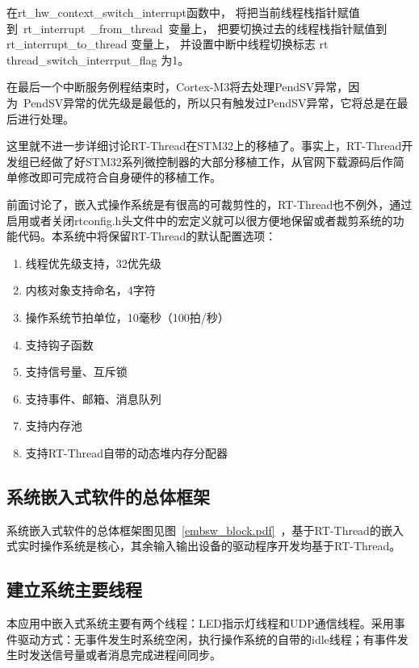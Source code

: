 在rt{\_}hw{\_}context{\_}switch{\_}interrupt函{\cf}数中{\cf}， {\cf}将把{\cf}当前{\cf}线程{\cf}栈指{\cf}针赋{\cf}值到~rt{\_}interrupt~{\_}from{\_}thread~变{\cf}量上{\cf}， {\cf}把要{\cf}切换{\cf}过去{\cf}的线{\cf}程栈{\cf}指针{\cf}赋值{\cf}到 rt{\_}interrupt{\_}to{\_}thread 变{\cf}量上{\cf}， {\cf}并设{\cf}置中{\cf}断中{\cf}线程{\cf}切换{\cf}标志{\cf} rt thread{\_}switch{\_}interrput{\_}flag 为1。

在{\cf}最后{\cf}一个{\cf}中断{\cf}服务{\cf}例程{\cf}结束{\cf}时，Cortex{\reg}-M3将{\cf}去处{\cf}理P{\cf}en{\cf}dS{\cf}V异{\cf}常，{\cf}因为~{\cf}Pe{\cf}nd{\cf}SV{\cf}异常{\cf}的优{\cf}先级{\cf}是最{\cf}低的{\cf}，所{\cf}以只{\cf}有触{\cf}发过{\cf}Pe{\cf}nd{\cf}SV{\cf}异常{\cf}，它{\cf}将总{\cf}是在{\cf}最后{\cf}进行{\cf}处理。

这里就不进一步详细讨论RT-Thread在STM32上的移植了。事实上，RT-Thread开发组已经做了好STM32系列微控制器的大部分移植工作，从官网下载源码后作简单修改即可完成符合自身硬件的移植工作。

前面讨论了，嵌入式操作系统是有很高的可裁剪性的，RT-Thread也不例外，通过启用或者关闭rtconfig.h头文件中的宏定义就可以很方便地保留或者裁剪系统的功能代码。本系统中将保留RT-Thread的默认配置选项：
\begin{enumerate}
\item 线程优先级支持，32优先级
\item 内核对象支持命名，4字符
\item 操作系统节拍单位，10毫秒（100拍/秒）
\item 支持钩子函数
\item 支持信号量、互斥锁
\item 支持事件、邮箱、消息队列
\item 支持内存池
\item 支持RT-Thread自带的动态堆内存分配器
\end{enumerate}

\subsection{系统嵌入式软件的总体框架}
系统嵌入式软件的总体框架图见图~\ref{embsw_block.pdf}~，基于RT-Thread的嵌入式实时操作系统是核心，其余输入输出设备的驱动程序开发均基于RT-Thread。

\subsection{建立系统主要线程}
本应用中嵌入式系统主要有两个线程：LED指示灯线程和UDP通信线程。采用事件驱动方式：无事件发生时系统空闲，执行操作系统的自带的idle线程；有事件发生时发送信号量或者消息完成进程间同步。

